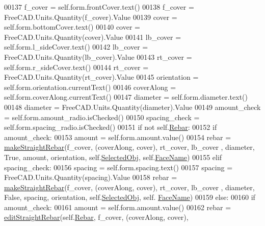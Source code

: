 \begin{DoxyCode}
00137         f\_cover = self.form.frontCover.text()
00138         f\_cover = FreeCAD.Units.Quantity(f\_cover).Value
00139         cover = self.form.bottomCover.text()
00140         cover = FreeCAD.Units.Quantity(cover).Value
00141         lb\_cover = self.form.l\_sideCover.text()
00142         lb\_cover = FreeCAD.Units.Quantity(lb\_cover).Value
00143         rt\_cover = self.form.r\_sideCover.text()
00144         rt\_cover = FreeCAD.Units.Quantity(rt\_cover).Value
00145         orientation = self.form.orientation.currentText()
00146         coverAlong = self.form.coverAlong.currentText()
00147         diameter = self.form.diameter.text()
00148         diameter = FreeCAD.Units.Quantity(diameter).Value
00149         amount\_check = self.form.amount\_radio.isChecked()
00150         spacing\_check = self.form.spacing\_radio.isChecked()
00151         \textcolor{keywordflow}{if} \textcolor{keywordflow}{not} self.\hyperlink{classStraightRebar_1_1__StraightRebarTaskPanel_a23fe17475277eae59cbed538f0f183cb}{Rebar}:
00152             \textcolor{keywordflow}{if} amount\_check:
00153                 amount = self.form.amount.value()
00154                 rebar = \hyperlink{namespaceStraightRebar_af6270367d7beae457813e33718d80faf}{makeStraightRebar}(f\_cover, (coverAlong, cover), rt\_cover, lb\_cover
      , diameter, \textcolor{keyword}{True}, amount, orientation, self.\hyperlink{classStraightRebar_1_1__StraightRebarTaskPanel_a4bdbe85e1cc468f34a907db99faebe85}{SelectedObj}, self.\hyperlink{classStraightRebar_1_1__StraightRebarTaskPanel_afe733532cc15a149f9ba8f7da4515413}{FaceName})
00155             \textcolor{keywordflow}{elif} spacing\_check:
00156                 spacing = self.form.spacing.text()
00157                 spacing = FreeCAD.Units.Quantity(spacing).Value
00158                 rebar = \hyperlink{namespaceStraightRebar_af6270367d7beae457813e33718d80faf}{makeStraightRebar}(f\_cover, (coverAlong, cover), rt\_cover, lb\_cover
      , diameter, \textcolor{keyword}{False}, spacing, orientation, self.\hyperlink{classStraightRebar_1_1__StraightRebarTaskPanel_a4bdbe85e1cc468f34a907db99faebe85}{SelectedObj}, self.
      \hyperlink{classStraightRebar_1_1__StraightRebarTaskPanel_afe733532cc15a149f9ba8f7da4515413}{FaceName})
00159         \textcolor{keywordflow}{else}:
00160             \textcolor{keywordflow}{if} amount\_check:
00161                 amount = self.form.amount.value()
00162                 rebar = \hyperlink{namespaceStraightRebar_ab4c578165b01dd7c7d121e5345de2d7b}{editStraightRebar}(self.\hyperlink{classStraightRebar_1_1__StraightRebarTaskPanel_a23fe17475277eae59cbed538f0f183cb}{Rebar}, f\_cover, (coverAlong, cover), 

\end{DoxyCode}
